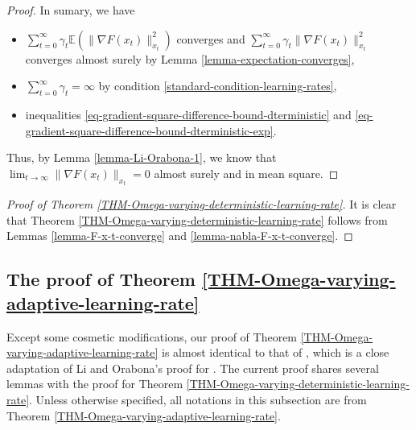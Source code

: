 \documentclass{amsart}
\newcommand{\E}{\mathbb{E}}
\newcommand{\g}{\gamma}
\theoremstyle{plain}
\theoremstyle{definition}
\theoremstyle{remark}
\numberwithin{theorem}{section}
\numberwithin{equation}{section}
\begin{document}
\begin{proof}
In sumary, we have
\begin{itemize}
	\item $\sum_{t=0}^\infty \g_t \E(\|\nabla F(x_t)\|_{x_t}^2)$ converges and $\sum_{t=0}^\infty \g_t \|\nabla F(x_t)\|_{x_t}^2$ converges almost surely by Lemma \ref{lemma-expectation-converges},
	\item $\sum_{t=0}^\infty \g_t = \infty$ by condition \eqref{standard-condition-learning-rates}, 
	\item inequalities \eqref{eq-gradient-square-difference-bound-dterministic} and \eqref{eq-gradient-square-difference-bound-dterministic-exp}.
\end{itemize}
Thus, by Lemma \ref{lemma-Li-Orabona-1}, we know that $\lim_{t \rightarrow \infty} \|\nabla F(x_t)\|_{x_t} =0$ almost surely and in mean square.
\end{proof}

\begin{proof}[Proof of Theorem \ref{THM-Omega-varying-deterministic-learning-rate}]
It is clear that Theorem \ref{THM-Omega-varying-deterministic-learning-rate} follows from Lemmas \ref{lemma-F-x-t-converge} and \ref{lemma-nabla-F-x-t-converge}.
\end{proof}

\subsection{The proof of Theorem \ref{THM-Omega-varying-adaptive-learning-rate}} 

Except some cosmetic modifications, our proof of Theorem \ref{THM-Omega-varying-adaptive-learning-rate} is almost identical to that of \cite[Theorem 2.7]{YXW-2024}, which is a close adaptation of Li and Orabona's proof for \cite[Theorem 2]{Li-Orabona}. The current proof shares several lemmas with the proof for Theorem \ref{THM-Omega-varying-deterministic-learning-rate}. Unless otherwise specified, all notations in this subsection are from Theorem \ref{THM-Omega-varying-adaptive-learning-rate}.
\end{document}
